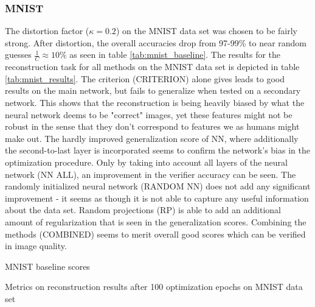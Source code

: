 \subsubsection{MNIST}


The distortion factor ($\kappa = 0.2$) on the MNIST data set was chosen to be fairly strong.
After distortion, the overall accuracies drop from 97-99\% to near random guesses $\frac 1 C \approx 10\%$
as seen in table \ref{tab:mnist_baseline}.
The results for the reconstruction task for all methods on the MNIST data set is depicted in table \ref{tab:mnist_results}.
The criterion (CRITERION) alone gives leads to good results on the main network, but fails to generalize when tested on a secondary network.
This shows that the reconstruction is being heavily biased by what the neural network deems to be "correct" images, 
yet these features might not be robust in the sense that they don't correspond to features we as humans might make out.
The hardly improved generalization score of NN, where additionally the second-to-last layer is incorporated seems to confirm
the network's bias in the optimization procedure. Only by taking into account all layers of the neural network (NN ALL), an
improvement in the verifier accuracy can be seen.
The randomly initialized neural network (RANDOM NN) does not add any significant improvement - it seems as though it is
not able to capture any useful information about the data set.
Random projections (RP) is able to add an additional amount of regularization that is seen in the generalization scores.
Combining the methods (COMBINED) seems to merit overall good scores which can be verified in image quality.


\begin{table}[!htbp]
\centering
\footnotesize
{}
\caption{MNIST baseline scores}
\label{tab:mnist_baseline}
\end{table}

\begin{table}[!htbp]
\centering
\footnotesize
{}
\caption{Metrics on reconstruction results after 100 optimization epochs on MNIST data set}
\label{tab:mnist_results}
\end{table}


